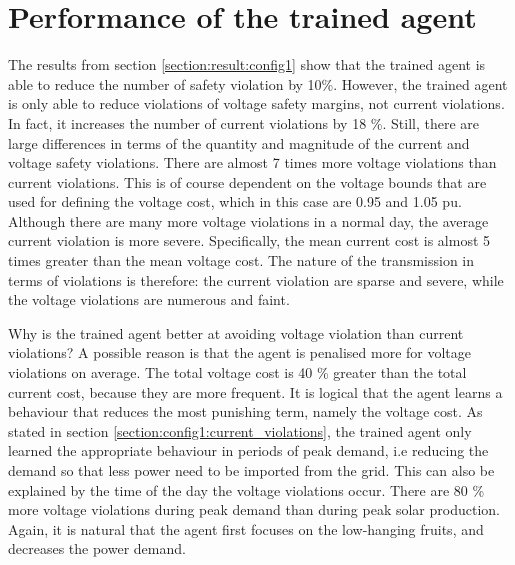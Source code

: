\documentclass[class=book, crop=false, 11pt]{standalone}
\begin{document}
\section{Performance of the trained agent}
The results from section \ref{section:result:config1} show that the trained agent is able to reduce the number of safety violation by 10\%. However, the trained agent is only able to reduce violations of voltage safety margins, not current violations. In fact, it increases the number of current violations by 18 \%. Still, there are large differences in terms of the quantity and magnitude of the current and voltage safety violations. There are almost 7 times more voltage violations than current violations. This is of course dependent on the voltage bounds that are used for defining the voltage cost, which in this case are 0.95 and 1.05 pu. Although there are many more voltage violations in a normal day, the average current violation is more severe. Specifically, the mean current cost is almost 5 times greater than the mean voltage cost. The nature of the transmission in terms of violations is therefore: the current violation are sparse and severe, while the voltage violations are numerous and faint. 

Why is the trained agent better at avoiding voltage violation than current violations? A possible reason is that the agent is penalised more for voltage violations on average. The total voltage cost is 40 \% greater than the total current cost, because they are more frequent. It is logical that the agent learns a behaviour that reduces the most punishing term, namely the voltage cost. As stated in section \ref{section:config1:current_violations}, the trained agent only learned the appropriate behaviour in periods of peak demand, i.e reducing the demand so that less power need to be imported from the grid. This can also be explained by the time of the day the voltage violations occur. There are 80 \% more voltage violations during peak demand than during peak solar production. Again, it is natural that the agent first focuses on the low-hanging fruits, and decreases the power demand.   
\end{document}
